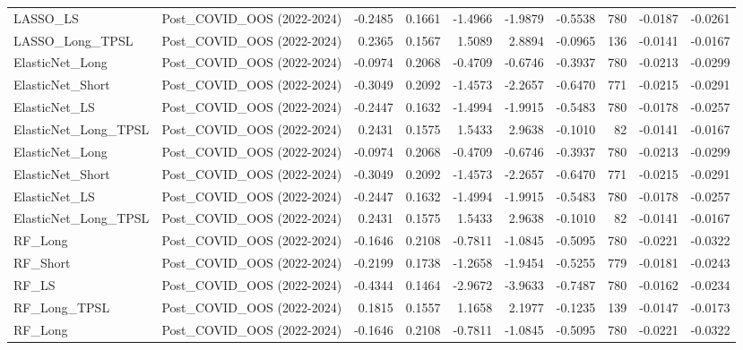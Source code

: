 \begin{tabular}{llrrrrrrrr}
\cline{1-10}
LASSO\_LS & Post\_COVID\_OOS (2022-2024) & -0.2485 & 0.1661 & -1.4966 & -1.9879 & -0.5538 & 780 & -0.0187 & -0.0261 \\
\cline{1-10}
LASSO\_Long\_TPSL & Post\_COVID\_OOS (2022-2024) & 0.2365 & 0.1567 & 1.5089 & 2.8894 & -0.0965 & 136 & -0.0141 & -0.0167 \\
\cline{1-10}
ElasticNet\_Long & Post\_COVID\_OOS (2022-2024) & -0.0974 & 0.2068 & -0.4709 & -0.6746 & -0.3937 & 780 & -0.0213 & -0.0299 \\
\cline{1-10}
ElasticNet\_Short & Post\_COVID\_OOS (2022-2024) & -0.3049 & 0.2092 & -1.4573 & -2.2657 & -0.6470 & 771 & -0.0215 & -0.0291 \\
\cline{1-10}
ElasticNet\_LS & Post\_COVID\_OOS (2022-2024) & -0.2447 & 0.1632 & -1.4994 & -1.9915 & -0.5483 & 780 & -0.0178 & -0.0257 \\
\cline{1-10}
ElasticNet\_Long\_TPSL & Post\_COVID\_OOS (2022-2024) & 0.2431 & 0.1575 & 1.5433 & 2.9638 & -0.1010 & 82 & -0.0141 & -0.0167 \\
\cline{1-10}
ElasticNet\_Long & Post\_COVID\_OOS (2022-2024) & -0.0974 & 0.2068 & -0.4709 & -0.6746 & -0.3937 & 780 & -0.0213 & -0.0299 \\
\cline{1-10}
ElasticNet\_Short & Post\_COVID\_OOS (2022-2024) & -0.3049 & 0.2092 & -1.4573 & -2.2657 & -0.6470 & 771 & -0.0215 & -0.0291 \\
\cline{1-10}
ElasticNet\_LS & Post\_COVID\_OOS (2022-2024) & -0.2447 & 0.1632 & -1.4994 & -1.9915 & -0.5483 & 780 & -0.0178 & -0.0257 \\
\cline{1-10}
ElasticNet\_Long\_TPSL & Post\_COVID\_OOS (2022-2024) & 0.2431 & 0.1575 & 1.5433 & 2.9638 & -0.1010 & 82 & -0.0141 & -0.0167 \\
\cline{1-10}
RF\_Long & Post\_COVID\_OOS (2022-2024) & -0.1646 & 0.2108 & -0.7811 & -1.0845 & -0.5095 & 780 & -0.0221 & -0.0322 \\
\cline{1-10}
RF\_Short & Post\_COVID\_OOS (2022-2024) & -0.2199 & 0.1738 & -1.2658 & -1.9454 & -0.5255 & 779 & -0.0181 & -0.0243 \\
\cline{1-10}
RF\_LS & Post\_COVID\_OOS (2022-2024) & -0.4344 & 0.1464 & -2.9672 & -3.9633 & -0.7487 & 780 & -0.0162 & -0.0234 \\
\cline{1-10}
RF\_Long\_TPSL & Post\_COVID\_OOS (2022-2024) & 0.1815 & 0.1557 & 1.1658 & 2.1977 & -0.1235 & 139 & -0.0147 & -0.0173 \\
\cline{1-10}
RF\_Long & Post\_COVID\_OOS (2022-2024) & -0.1646 & 0.2108 & -0.7811 & -1.0845 & -0.5095 & 780 & -0.0221 & -0.0322 \\

\end{tabular}
